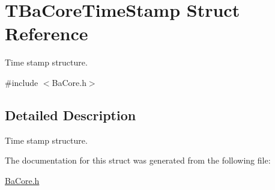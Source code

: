 \hypertarget{structTBaCoreTimeStamp}{}\section{T\+Ba\+Core\+Time\+Stamp Struct Reference}
\label{structTBaCoreTimeStamp}


Time stamp structure.  




{\ttfamily \#include $<$Ba\+Core.\+h$>$}



\subsection{Detailed Description}
Time stamp structure. 

The documentation for this struct was generated from the following file\+:\begin{DoxyCompactItemize}
\item 
\hyperlink{BaCore_8h}{Ba\+Core.\+h}\end{DoxyCompactItemize}
